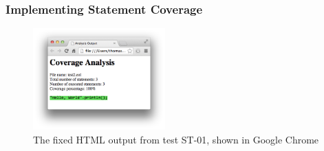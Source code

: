 \begin{frame}
\frametitle{Implementing Statement Coverage}
\begin{figure}
  \centering
  \includegraphics[width=2in]{presentation/images/st01fixed}
  \caption{The fixed HTML output from test ST-01, shown in Google Chrome}
  \label{fig:ST01HTML}
\end{figure}
\end{frame}